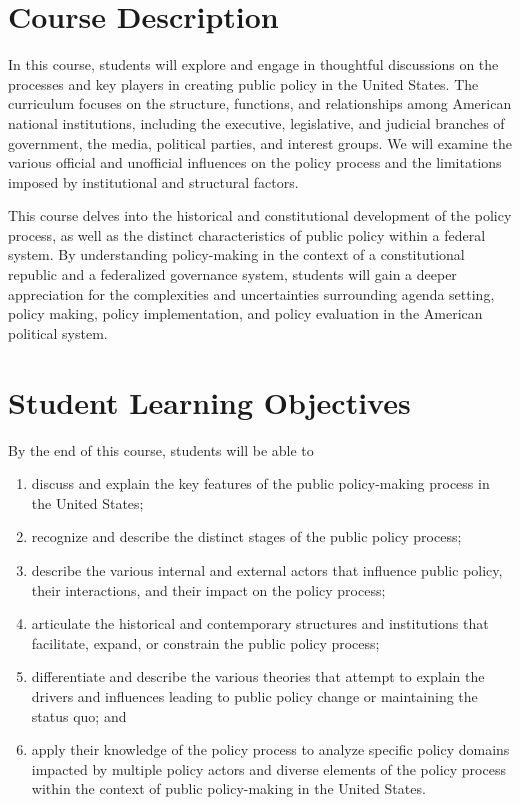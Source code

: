 \documentclass[12pt, letterpaper]{article}
\begin{document}
\section*{Course Description}

	In this course, students will explore and engage in thoughtful discussions on the processes and key players in creating public policy in the United States. The curriculum focuses on the structure, functions, and relationships among American national institutions, including the executive, legislative, and judicial branches of government, the media, political parties, and interest groups. We will examine the various official and unofficial influences on the policy process and the limitations imposed by institutional and structural factors.

	This course delves into the historical and constitutional development of the policy process, as well as the distinct characteristics of public policy within a federal system. By understanding policy-making in the context of a constitutional republic and a federalized governance system, students will gain a deeper appreciation for the complexities and uncertainties surrounding agenda setting, policy making, policy implementation, and policy evaluation in the American political system.

\section*{Student Learning Objectives}

By the end of this course, students will be able to

\begin{enumerate}
	\item discuss and explain the key features of the public policy-making process in the United States;
	\item recognize and describe the distinct stages of the public policy process;
	\item describe the various internal and external actors that influence public policy, their interactions, and their impact on the policy process;
	\item articulate the historical and contemporary structures and institutions that facilitate, expand, or constrain the public policy process;
	\item differentiate and describe the various theories that attempt to explain the drivers and influences leading to public policy change or maintaining the status quo; and
	\item apply their knowledge of the policy process to analyze specific policy domains impacted by multiple policy actors and diverse elements of the policy process within the context of public policy-making in the United States.
\end{enumerate}
\end{document}

